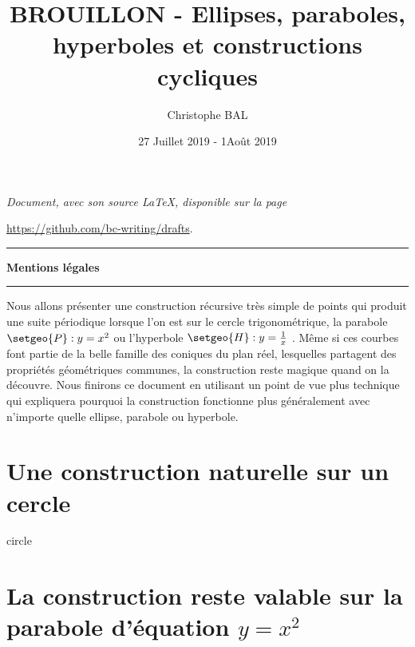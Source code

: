 \documentclass[12pt]{amsart}
\begin{document}
\title{BROUILLON - Ellipses, paraboles, hyperboles et constructions cycliques}
\author{Christophe BAL}
\date{27 Juillet 2019 - 1\ier Août 2019}

\maketitle

\begin{center}
	\itshape
	Document, avec son source \LaTeX, disponible sur la page
	
	\url{https://github.com/bc-writing/drafts}.
\end{center}


\bigskip


\begin{center}
	\hrule\vspace{.3em}
	{
		\fontsize{1.35em}{1em}\selectfont
		\textbf{Mentions \og légales \fg}
	}
			
	\vspace{0.45em}
	\doclicenseThis
	\hrule
\end{center}


\setcounter{tocdepth}{2}
\tableofcontents


Nous allons présenter une construction récursive très simple de points qui produit une suite périodique lorsque l'on est sur le cercle trigonométrique, la parabole $\setgeo{P} : y = x^2$ ou l'hyperbole $\setgeo{H} : y = \frac{1}{x}$ .
Même si ces courbes font partie de la belle famille des coniques du plan réel, lesquelles partagent des propriétés géométriques communes, la construction reste magique quand on la découvre.
Nous finirons ce document en utilisant un point de vue plus technique qui expliquera pourquoi la construction fonctionne plus généralement avec n'importe quelle ellipse, parabole ou hyperbole. 




\section{Une construction naturelle sur un cercle}
\label{circle}

{circle}




\section{\texorpdfstring{La construction reste valable sur la parabole d'équation $y = x^2$}%
                        {La construction reste valable sur la parabole d'équation y = x**2}}
\label{parabola}
\end{document}
